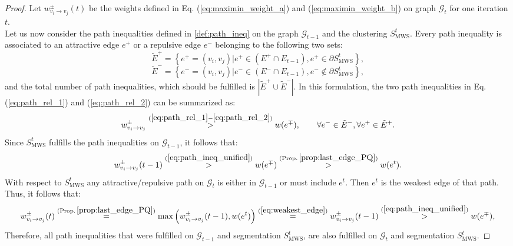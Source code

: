 \begin{proof}
Let $w_{v_{i}\rightarrow v_{j}}^{\pm}(t)$ be the weights defined
in Eq. (\ref{eq:maximin_weight_a}) and (\ref{eq:maximin_weight_b}) on graph $\mathcal{G}_{t}$
for one iteration \textbf{$t$}. \\
Let us now consider the path inequalities
defined in \autoref{def:path_ineq} on the graph $\mathcal{G}_{t-1}$ and the
clustering $S_{\mathrm{MWS}}^{t}$. Every path inequality is associated
to an attractive edge $e^{+}$ or a repulsive edge $e^{-}$ belonging
to the following two sets: 
\begin{equation}
\tilde{E}^{+}=\left\{ e^{+}=(v_{i},v_{j})|e^{+}\in\left(E^{+}\cap E_{t-1}\right),e^{+}\in\partial S_{\mathrm{MWS}}^{t}\right\} ,\label{eq:attractive_ineq}
\end{equation}
\begin{equation}
\tilde{E}^{-}=\left\{ e^{-}=(v_{i},v_{j})|e^{-}\in\left(E^{-}\cap E_{t-1}\right),e^{-}\notin\partial S_{\mathrm{MWS}}^{t}\right\} ,\label{eq:repulsive_ineq}
\end{equation}
and the total number of path inequalities, which should be fulfilled
is $\left|\tilde{E}^{+}\cup\tilde{E}^{-}\right|$. 
In this formulation,
the two path inequalities in Eq. (\ref{eq:path_rel_1}) and (\ref{eq:path_rel_2}) can be summarized as:
\begin{equation}
w_{v_{i}\rightarrow v_{j}}^{\pm}\stackrel{(\ref{eq:path_rel_1}-\ref{eq:path_rel_2})}{>}w(e^{\mp}),\quad\quad\forall e^{-}\in\tilde{E}^{-},\forall e^{+}\in\tilde{E}^{+}.\label{eq:path_ineq_unified}
\end{equation}
Since $S_{\mathrm{MWS}}^{t}$ fulfills the path inequalities on $\mathcal{G}_{t-1}$, it follows that:
\begin{equation}
w_{v_{i}\rightarrow v_{j}}^{\pm}(t-1)\stackrel{(\ref{eq:path_ineq_unified})}{>}w(e^{\mp})\stackrel{\mathrm{(Prop.\,\ref{prop:last_edge_PQ})}}{>}w(e^{t}). \label{eq:weakest_edge}
\end{equation}
With respect to $S_{\mathrm{MWS}}^{t}$ any attractive/repulsive path on $\mathcal{G}_{t}$ is either in $\mathcal{G}_{t-1}$ or must include $e^{t}$. Then $e^{t}$ is the
weakest edge of that path. Thus, it follows that: 
\[
w_{v_{i}\rightarrow v_{j}}^{\pm}(t) \stackrel{\mathrm{(Prop.\,\ref{prop:last_edge_PQ})}}{=} \max\left(w_{v_{i}\rightarrow v_{j}}^{\pm}(t-1),w(e^{t})\right) \stackrel{(\ref{eq:weakest_edge})}{=} w_{v_{i}\rightarrow v_{j}}^{\pm}(t-1)\stackrel{(\ref{eq:path_ineq_unified})}{>}w(e^{\mp}),
\]
Therefore, all path inequalities that were fulfilled on
$\mathcal{G}_{t-1}$ and segmentation $S_{\mathrm{MWS}}^{t}$, are
also fulfilled on $\mathcal{G}_{t}$ and segmentation $S_{\mathrm{MWS}}^{t}$.
\end{proof}


